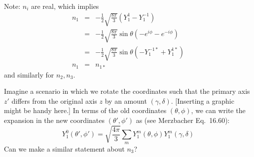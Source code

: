 \documentclass[11pt]{article}
\begin{document}
\noindent
Note: $n_i$ are real, which implies
\begin{eqnarray}
n_1 &=& -\frac{1}{2} \sqrt{\frac{8 \pi}{3}} \left( Y_1^1 - Y_1^{-1} \right) \\
&=&  -\frac{1}{2} \sqrt{\frac{8 \pi}{3}} \sin \theta \left( -e^{i \phi} - e^{-i\phi}  \right) \\
&=& -\frac{1}{2} \sqrt{\frac{8 \pi}{3}} \sin \theta \left( -Y_1^{-1*} + Y_1^{1*} \right) \\
n_1 &=& n_{1*}
\end{eqnarray}
and similarly for $n_2, n_3$.

\noindent
Imagine a scenario in which we rotate the coordinates such that the primary axis $z'$ differs from the original axis $z$ by an amount $(\gamma, \delta)$. [Inserting a graphic might be handy here.] In terms of the old coordinates $(\theta, \phi)$, we can write the expansion in the new coordinates $(\theta', \phi')$ as (see Merzbacher Eq.~16.60):
\begin{equation}
Y_1^0 (\theta', \phi') = \sqrt{\frac{4 \pi}{3}} \sum_m Y_1^m(\theta, \phi) Y_1^m(\gamma, \delta)
\end{equation}
Can we make a similar statement about $n_3$?
\end{document}
